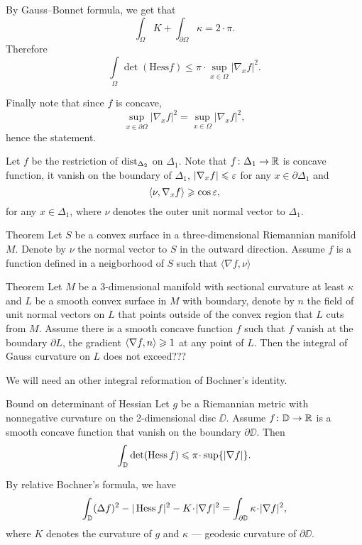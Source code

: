 By Gauss--Bonnet formula, we get that
\[\int_\Omega K+\int_{\partial\Omega}\kappa=2\cdot\pi.\]
Therefore 
\[\int\limits_\Omega 
\det(\mathrm{Hess}f)
\le\pi\cdot\sup_{x\in\Omega}|\nabla_x f|^2.\]

Finally note that since $f$ is concave, 
\[\sup_{x\in\partial\Omega}|\nabla_x f|^2=\sup_{x\in\Omega}|\nabla_x f|^2,\]
hence the statement.
\qeds


Let $f$ be the restriction of $\operatorname{dist}_{\Delta_2}$ on $\Delta_1$.
Note that $f\colon\Delta_1\to \mathbb{R}$ is concave function, 
it vanish on the boundary of $\Delta_1$,
$|\nabla_x f|\leqslant \varepsilon$ for any $x\in \partial \Delta_1$
and 
\[\langle\nu,\nabla_x f\rangle\geqslant \cos\varepsilon,\]
for any $x\in\Delta_1$,
where $\nu$ denotes the outer unit normal vector to $\Delta_1$. 


\qeds



\begin{thm}{Theorem}
Let $S$ be a convex surface in a three-dimensional Riemannian manifold $M$.
Denote by $\nu$ the normal vector to $S$ in the outward direction.
Assume $f$ is a function defined in a neigborhood of $S$ such that 
$\langle \nabla f,\nu\rangle$
\end{thm}



\begin{thm}{Theorem}
Let $M$ be a 3-dimensional manifold with sectional curvature at least $\kappa$ and $L$ be a smooth convex surface in $M$ with boundary, denote by $n$ the field of unit normal vectors on $L$ that points outside of the convex region that $L$ cuts from $M$.
Assume there is a smooth concave function $f$ such that $f$ vanish at the boundary $\partial L$,
the gradient $\langle\nabla f,n\rangle\geqslant 1$ at any point of $L$.
Then the integral of Gauss curvature on $L$ does not exceed???
\end{thm}

We will need an other integral reformation of Bochner's identity.

\begin{thm}{Bound on determinant of Hessian}
Let $g$ be a Riemannian metric with nonnegative curvature on the 2-dimensional disc $\DD$.
Assume $f\:\DD\zz\to \RR$ is a smooth concave function that vanish on the boundary $\partial \DD$.
Then 
\[\int_\DD \det(\Hess f)\le \pi\cdot \sup\{|\nabla f|\}. \]
\end{thm}

By relative Bochner's formula, we have
\[\int_\DD(\Delta f)^2-|\Hess f|^2-K\cdot |\nabla f|^2=\int_{\partial\DD} \kappa\cdot |\nabla f|^2,\]
where $K$ denotes the curvature of $g$ and $\kappa$ --- geodesic curvature of $\partial\DD$.

